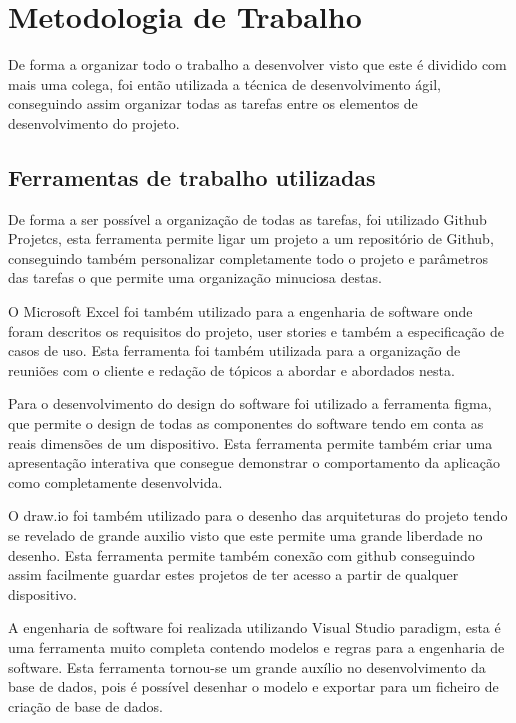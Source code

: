 
\chapter{Metodologia de Trabalho}
De forma a organizar todo o trabalho a desenvolver visto que este é dividido com mais uma colega, 
foi então utilizada a técnica de desenvolvimento ágil, conseguindo assim organizar todas as tarefas 
entre os elementos de desenvolvimento do projeto.

\section{Ferramentas de trabalho utilizadas}

De forma a ser possível a organização de todas as tarefas, foi utilizado Github Projetcs, esta ferramenta 
permite ligar um projeto a um repositório de Github, conseguindo também personalizar completamente todo 
o projeto e parâmetros das tarefas o que permite uma organização minuciosa destas.

O Microsoft Excel foi também utilizado para a engenharia de software onde foram descritos os requisitos 
do projeto, user stories e também a especificação de casos de uso. Esta ferramenta foi também utilizada 
para a organização de reuniões com o cliente e redação de tópicos a abordar e abordados nesta.

Para o desenvolvimento do design do software foi utilizado a ferramenta figma, que permite o design de 
todas as componentes do software tendo em conta as reais dimensões de um dispositivo. Esta ferramenta 
permite também criar uma apresentação interativa que consegue demonstrar o comportamento da aplicação 
como completamente desenvolvida.

O draw.io foi também utilizado para o desenho das arquiteturas do projeto tendo se revelado de grande 
auxilio visto que este permite uma grande liberdade no desenho. Esta ferramenta permite também 
conexão com github conseguindo assim facilmente guardar estes projetos de ter acesso a partir de qualquer 
dispositivo.

A engenharia de software foi realizada utilizando Visual Studio paradigm, esta é uma ferramenta muito 
completa contendo modelos e regras para a engenharia de software. Esta ferramenta tornou-se um grande 
auxílio no desenvolvimento da base de dados, pois é possível desenhar o modelo e exportar para um ficheiro 
de criação de base de dados.

